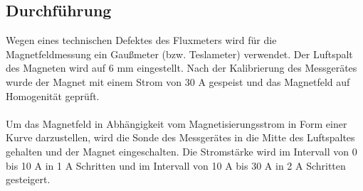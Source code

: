 \documentclass[a4paper,twoside,12pt,DIV=13,BCOR=5mm,numbers=noenddot,cleardoublepage=empty]{scrbook}
\begin{document}
        \subsection{Durchf\"uhrung}
        Wegen eines technischen Defektes des Fluxmeters wird f\"ur die Magnetfeldmessung ein Gau\ss{}meter (bzw. Teslameter) verwendet. Der Luftspalt des Magneten wird auf 6 mm eingestellt. Nach der Kalibrierung des Messger\"ates wurde der Magnet mit einem Strom von 30 A gespeist und das Magnetfeld auf Homogenit\"at gepr\"uft.
        \\
        \\
        Um das Magnetfeld in Abh\"angigkeit vom Magnetisierungsstrom in Form einer Kurve darzustellen, wird die Sonde des Messger\"ates in die Mitte des Luftspaltes gehalten und der Magnet eingeschalten. Die Stromst\"arke wird im Intervall von 0 bis 10 A in 1 A Schritten und im Intervall von 10 A bis 30 A in 2 A Schritten gesteigert.
\end{document}
